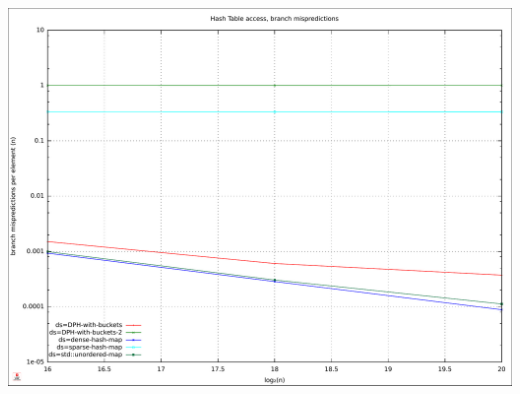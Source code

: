 \documentclass{article}
\begin{document}
\includegraphics[width=\linewidth]{img/hash_access_branchmiss}
\raggedright
\end{document}
